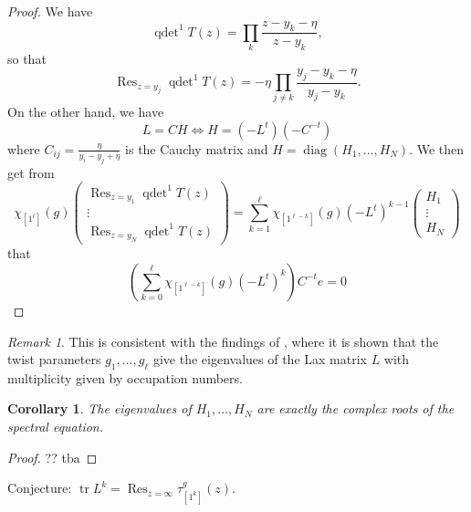 \documentclass[11pt]{report}
\newtheorem{corollary}[theorem]{Corollary}
\theoremstyle{definition}
\theoremstyle{remark}
\newtheorem*{remark}{Remark}
\theoremstyle{remark}
\begin{document}
\begin{proof}
We have
\begin{equation*}
\operatorname{qdet}^1 T(z) = \prod_k \frac{z-y_k-\eta}{z-y_k},
\end{equation*}
so that
\begin{equation*}
\operatorname{Res}_{z=y_j} \operatorname{qdet}^1 T(z) = -\eta \prod_{j \neq k} \frac{y_j-y_k-\eta}{y_j-y_k}.
\end{equation*}
On the other hand, we have
\begin{equation*}
L = CH \Leftrightarrow H = (-L^t) (-C^{-t})
\end{equation*}
where $C_{ij} = \frac{\eta}{y_i-y_j+\eta}$ is the Cauchy matrix and $H = \operatorname{diag}(H_1,...,H_N)$.
We then get from
\begin{equation*}
\chi_{[1^\ell]}(g)
\begin{pmatrix}
\operatorname{Res}_{z=y_1} \operatorname{qdet}^1 T(z) \\ \vdots \\ \operatorname{Res}_{z=y_N} \operatorname{qdet}^1 T(z)
\end{pmatrix}
= \sum_{k=1}^\ell \chi_{[1^{\ell-k}]}(g) (-L^t)^{k-1}
\begin{pmatrix}
H_1 \\ \vdots \\ H_N
\end{pmatrix}
\end{equation*}
that
\begin{equation*}
\left( \sum_{k=0}^\ell \chi_{[1^{\ell-k}]}(g) (-L^t)^k \right) C^{-t} e = 0
\end{equation*}
\end{proof}

\begin{remark}
This is consistent with the findings of \cite{article:gorsky:2014}, where it is shown that the twist parameters $g_1,...,g_\ell$ give the eigenvalues of the Lax matrix $L$ with multiplicity given by occupation numbers.
\end{remark}

\begin{corollary}
The eigenvalues of $H_1,...,H_N$ are exactly the complex roots of the spectral equation.
\end{corollary}

\begin{proof}
?? tba
\end{proof}

Conjecture: $\operatorname{tr} L^k = \operatorname{Res}_{z=\infty} \tau_{[1^k]}^g(z)$.
\end{document}
